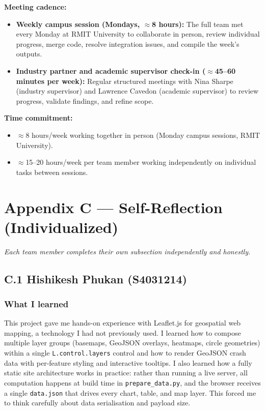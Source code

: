 \documentclass[11pt,a4paper]{article}
\begin{document}
\textbf{Meeting cadence:}
\begin{itemize}
  \item \textbf{Weekly campus session (Mondays, $\approx$8 hours):} The full team met every Monday at RMIT University to collaborate in person, review individual progress, merge code, resolve integration issues, and compile the week's outputs.
  \item \textbf{Industry partner and academic supervisor check-in ($\approx$45--60 minutes per week):} Regular structured meetings with Nina Sharpe (industry supervisor) and Lawrence Cavedon (academic supervisor) to review progress, validate findings, and refine scope.
\end{itemize}

\textbf{Time commitment:}
\begin{itemize}
  \item $\approx$8 hours/week working together in person (Monday campus sessions, RMIT University).
  \item $\approx$15--20 hours/week per team member working independently on individual tasks between sessions.
\end{itemize}

\newpage
\section*{Appendix C — Self-Reflection (Individualized)}

\textit{Each team member completes their own subsection independently and honestly.}

\subsection*{C.1 Hishikesh Phukan (S4031214)}

\subsubsection*{What I learned}
This project gave me hands-on experience with Leaflet.js for geospatial web mapping, a technology I had not previously used. I learned how to compose multiple layer groups (basemaps, GeoJSON overlays, heatmaps, circle geometries) within a single \texttt{L.control.layers} control and how to render GeoJSON crash data with per-feature styling and interactive tooltips. I also learned how a fully static site architecture works in practice: rather than running a live server, all computation happens at build time in \texttt{prepare\_data.py}, and the browser receives a single \texttt{data.json} that drives every chart, table, and map layer. This forced me to think carefully about data serialisation and payload size.
\end{document}
